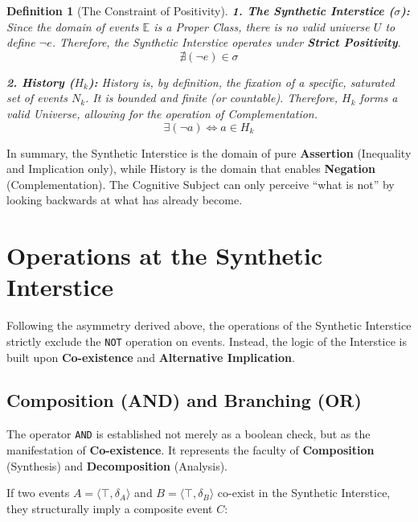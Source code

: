 \documentclass[11pt, a4paper]{article}
\theoremstyle{formalism}
\newtheorem{formalism}{Definition}
\begin{document}
\begin{formalism}[The Constraint of Positivity]
    \textbf{1. The Synthetic Interstice ($\sigma$):} 
    Since the domain of events $\mathbb{E}$ is a Proper Class, there is no valid 
    universe $U$ to define $\neg e$. Therefore, the Synthetic Interstice operates 
    under \textbf{Strict Positivity}.
    \begin{equation}
        \nexists (\neg e) \in \sigma
    \end{equation}
    
    \textbf{2. History ($H_k$):} 
    History is, by definition, the \textit{fixation} of a specific, saturated set 
    of events $N_k$. It is bounded and finite (or countable). Therefore, $H_k$ 
    forms a valid Universe, allowing for the operation of Complementation.
    \begin{equation}
        \exists (\neg a) \iff a \in H_k
    \end{equation}
\end{formalism}

In summary, the Synthetic Interstice is the domain of pure \textbf{Assertion} (Inequality and Implication only), while History is the domain that enables \textbf{Negation} (Complementation). The Cognitive Subject can only perceive ``what is not'' by looking backwards at what has already become.

\section{Operations at the Synthetic Interstice}

Following the asymmetry derived above, the operations of the Synthetic Interstice strictly exclude the \texttt{NOT} operation on events. Instead, the logic of the Interstice is built upon \textbf{Co-existence} and \textbf{Alternative Implication}.

\subsection{Composition (AND) and Branching (OR)}

The operator \texttt{AND} is established not merely as a boolean check, but as the manifestation of \textbf{Co-existence}. It represents the faculty of \textbf{Composition} (Synthesis) and \textbf{Decomposition} (Analysis).

If two events $A = \langle \top, \delta_A \rangle$ and $B = \langle \top, \delta_B \rangle$ co-exist in the Synthetic Interstice, they structurally imply a composite event $C$:
\end{document}
